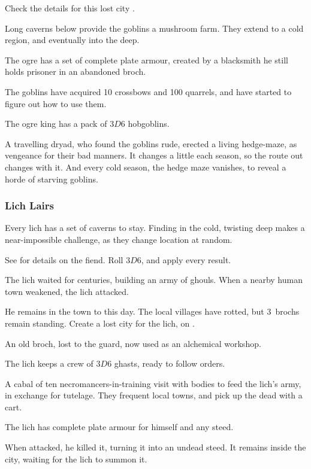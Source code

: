 \begin{multicols}{2}
\begin{dlist}
  Check the details for this lost city .
  \item
  Long caverns below provide the goblins a mushroom farm.
  They extend to a cold region, and eventually into the \gls{deep}.
  \item
  The \gls{ogre} has a set of complete plate armour, created by a blacksmith he still holds prisoner in an abandoned \gls{broch}.
  \item
  The goblins have acquired 10 crossbows and 100 quarrels, and have started to figure out how to use them.
  \item
  The \gls{ogre} king has a pack of $3D6$ hobgoblins.
  \item
  A travelling dryad, who found the goblins rude, erected a living hedge-maze, as vengeance for their bad manners.
  It changes a little each season, so the route out changes with it.
  And every cold season, the hedge maze vanishes, to reveal a horde of starving goblins.
\end{dlist}

\subsubsection{Lich Lairs}
\label{lichPoint}

Every \gls{lich} has a set of caverns to stay.
Finding  in the cold, twisting \gls{deep} makes a near-impossible challenge, as they change location at random.

See  for details on the fiend.
Roll $3D6$, and apply every result.

\begin{dlist}
  \item
  The \gls{lich} waited for centuries, building an army of ghouls.
  When a nearby human town weakened, the \gls{lich} attacked.

  He remains in the town to this day.
  The local \glspl{village} have rotted, but 3~\glspl{broch} remain standing.
  Create a lost city for the \gls{lich}, on .
  \item
  An old \gls{broch}, lost to the \gls{guard}, now used as an alchemical workshop.
  \item
  The \gls{lich} keeps a crew of $3D6$ ghasts, ready to follow orders.
  \item
  A cabal of ten necromancers-in-training visit with bodies to feed the \gls{lich}'s army, in exchange for tutelage.
  They frequent local towns, and pick up the dead with a cart.
  \item
  The \gls{lich} has complete plate armour for himself and any steed.
  \item
  When  attacked, he killed it, turning it into an undead steed.
  It remains inside the city, waiting for the \gls{lich} to summon it.
\end{dlist}

\end{multicols}

